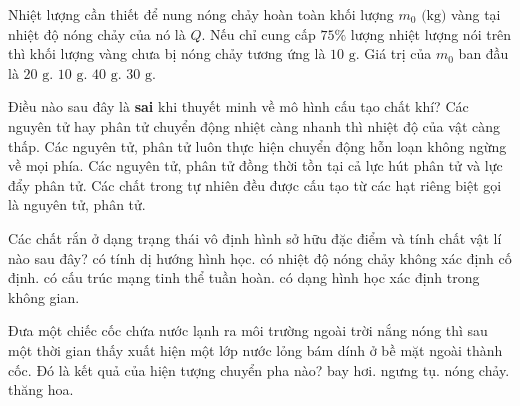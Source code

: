 \begin{ex}%
	Nhiệt lượng cần thiết để nung nóng chảy hoàn toàn khối lượng $m_0\text{ (kg)}$ vàng tại nhiệt độ nóng chảy của nó là $Q$. Nếu chỉ cung cấp $75\%$ lượng nhiệt lượng nói trên thì khối lượng vàng chưa bị nóng chảy tương ứng là $10\text{ g}$. Giá trị của $m_0$ ban đầu là
	\choice
	{$20\text{ g}$.}
	{$10\text{ g}$.}
	{\True $40\text{ g}$.}
	{$30\text{ g}$.}
\end{ex}

\begin{ex}%
	Điều nào sau đây là \textbf{sai} khi thuyết minh về mô hình cấu tạo chất khí?
	\choice
	{\True Các nguyên tử hay phân tử chuyển động nhiệt càng nhanh thì nhiệt độ của vật càng thấp.}
	{Các nguyên tử, phân tử luôn thực hiện chuyển động hỗn loạn không ngừng về mọi phía.}
	{Các nguyên tử, phân tử đồng thời tồn tại cả lực hút phân tử và lực đẩy phân tử.}
	{Các chất trong tự nhiên đều được cấu tạo từ các hạt riêng biệt gọi là nguyên tử, phân tử.}
\end{ex}

\begin{ex}%
	Các chất rắn ở dạng trạng thái vô định hình sở hữu đặc điểm và tính chất vật lí nào sau đây?
	\choice
	{có tính dị hướng hình học.}
	{\True có nhiệt độ nóng chảy không xác định cố định.}
	{có cấu trúc mạng tinh thể tuần hoàn.}
	{có dạng hình học xác định trong không gian.}
\end{ex}

\begin{ex}%
	Đưa một chiếc cốc chứa nước lạnh ra môi trường ngoài trời nắng nóng thì sau một thời gian thấy xuất hiện một lớp nước lỏng bám dính ở bề mặt ngoài thành cốc. Đó là kết quả của hiện tượng chuyển pha nào?
	\choice
	{bay hơi.}
	{\True ngưng tụ.}
	{nóng chảy.}
	{thăng hoa.}
\end{ex}


